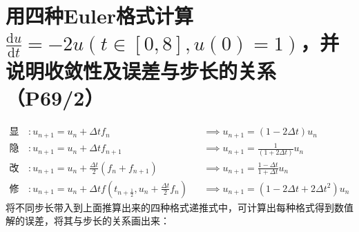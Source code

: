 \documentclass{homework}
\begin{document}
\section{用四种Euler格式计算$\frac{\mathrm{d}u}{\mathrm{d}t}=-2u\left(t\in[0,8],u(0)=1\right)$，并说明收敛性及误差与步长的关系（P69/2）}
\begin{align*}
    \text{显式}&: u_{n+1}=u_n+\Delta tf_n &
    &\implies u_{n+1}=(1-2\Delta t)u_n \\
    \text{隐式}&: u_{n+1}=u_n+\Delta tf_{n+1} &
    &\implies u_{n+1}=\frac{1}{(1+2\Delta t)}u_n \\
    \text{改进}&: u_{n+1}=u_n+\frac{\Delta t}{2}(f_n+f_{n+1}) &
    &\implies u_{n+1}=\frac{1-\Delta t}{1+\Delta t}u_n \\
    \text{修正}&: u_{n+1}=u_n+\Delta tf(t_{n+\frac{1}{2}},u_n+\frac{\Delta t}{2}f_n) &
    &\implies u_{n+1}=(1-2\Delta t+2\Delta t^2)u_n
\end{align*}
将不同步长带入到上面推算出来的四种格式递推式中，可计算出每种格式得到数值解的误差，将其与步长的关系画出来：
\end{document}
